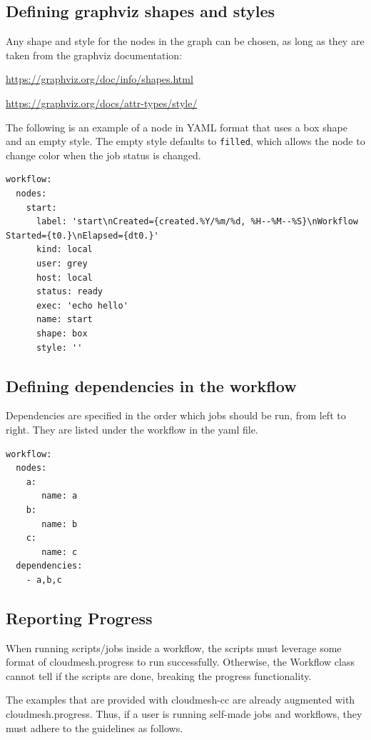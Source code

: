 \subsection{Defining graphviz shapes and
styles}\label{defining-graphviz-shapes-and-styles}

Any shape and style for the nodes in the graph can be chosen, as long as
they are taken from the graphviz documentation:

\url{https://graphviz.org/doc/info/shapes.html}

\url{https://graphviz.org/docs/attr-types/style/}

The following is an example of a node in YAML format that uses a box
shape and an empty style. The empty style defaults to \texttt{filled},
which allows the node to change color when the job status is changed.

\begin{verbatim}
workflow:
  nodes:
    start:
      label: 'start\nCreated={created.%Y/%m/%d, %H--%M--%S}\nWorkflow Started={t0.}\nElapsed={dt0.}'
      kind: local
      user: grey
      host: local
      status: ready
      exec: 'echo hello'
      name: start
      shape: box
      style: ''
\end{verbatim}

\subsection{Defining dependencies in the
workflow}\label{defining-dependencies-in-the-workflow}

Dependencies are specified in the order which jobs should be run, from
left to right. They are listed under the workflow in the yaml file.

\begin{verbatim}
workflow:
  nodes:
    a:
       name: a
    b:
       name: b
    c:
       name: c
  dependencies:
    - a,b,c
\end{verbatim}

\subsection{Reporting Progress}\label{reporting-progress}

When running scripts/jobs inside a workflow, the scripts must leverage
some format of cloudmesh.progress to run successfully. Otherwise, the
Workflow class cannot tell if the scripts are done, breaking the
progress functionality.

The examples that are provided with cloudmesh-cc are already augmented
with cloudmesh.progress. Thus, if a user is running self-made jobs and
workflows, they must adhere to the guidelines as follows.

